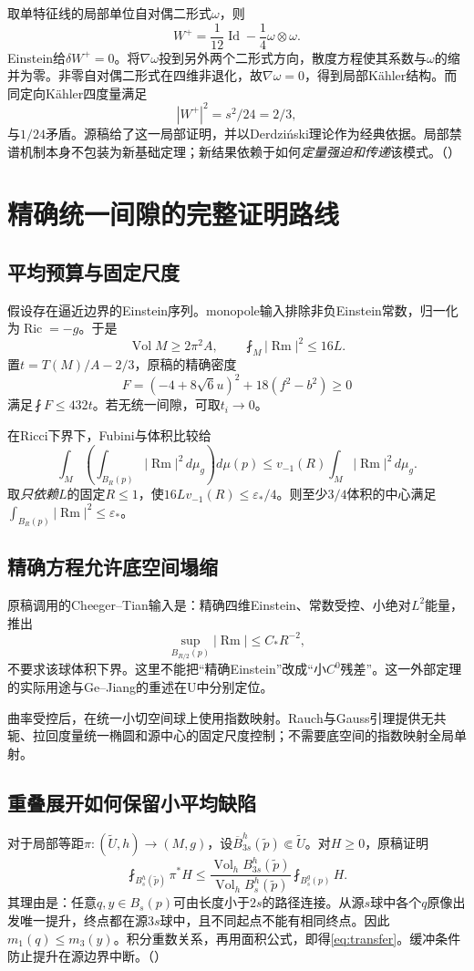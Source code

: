\documentclass[UTF8,fontset=fandol,zihao=-4]{ctexart}
\theoremstyle{research}
\DeclareMathOperator{\Ric}{Ric}
\DeclareMathOperator{\Rm}{Rm}
\DeclareMathOperator{\Vol}{Vol}
\DeclareMathOperator{\Id}{Id}
\newcommand{\dd}{\,d\mu_g}
\numberwithin{equation}{section}
\begin{document}
取单特征线的局部单位自对偶二形式$\omega$，则
\[
W^+=\frac1{12}\Id-\frac14\omega\otimes\omega.
\]
Einstein给$\delta W^+=0$。将$\nabla\omega$投到另外两个二形式方向，散度方程使其系数与$\omega$的缩并为零。非零自对偶二形式在四维非退化，故$\nabla\omega=0$，得到局部Kähler结构。而同定向Kähler四度量满足
\[
|W^+|^2=s^2/24=2/3,
\]
与$1/24$矛盾。源稿给了这一局部证明，并以Derdziński理论作为经典依据。局部禁谱机制本身不包装为新基础定理；新结果依赖于如何\emph{定量强迫和传递}该模式。\cite{U}（）\cite{Derdzinski}

\section{精确统一间隙的完整证明路线}
\subsection{平均预算与固定尺度}
假设存在逼近边界的Einstein序列。monopole输入排除非负Einstein常数，归一化为$\Ric=-g$。于是
\[
\Vol M\ge2\pi^2A,\qquad \fint_M|\Rm|^2\le16L.
\]
置$t=T(M)/A-2/3$，原稿的精确密度
\[
F=(-4+8\sqrt6u)^2+18(f^2-b^2)\ge0
\]
满足$\fint F\le432t$。若无统一间隙，可取$t_i\to0$。

在Ricci下界下，Fubini与体积比较给
\[
\int_M\left(\int_{B_R(p)}|\Rm|^2\dd\right)d\mu(p)
\le v_{-1}(R)\int_M|\Rm|^2\dd.
\]
取\emph{只依赖$L$}的固定$R\le1$，使$16L v_{-1}(R)\le\varepsilon_*/4$。则至少$3/4$体积的中心满足$\int_{B_R(p)}|\Rm|^2\le\varepsilon_*$。

\subsection{精确方程允许底空间塌缩}
原稿调用的Cheeger--Tian输入是：精确四维Einstein、常数受控、小绝对$L^2$能量，推出
\[
\sup_{B_{R/2}(p)}|\Rm|\le C_*R^{-2},
\]
不要求该球体积下界。这里不能把“精确Einstein”改成“小$C^0$残差”。这一外部定理的实际用途与Ge--Jiang的重述在U中分别定位。\cite{CT,GeJiang}

曲率受控后，在统一小切空间球上使用指数映射。Rauch与Gauss引理提供无共轭、拉回度量统一椭圆和源中心的固定尺度控制；不需要底空间的指数映射全局单射。

\subsection{重叠展开如何保留小平均缺陷}
对于局部等距$\pi:(\widetilde U,h)\to(M,g)$，设$\overline B_{3s}^h(\tilde p)\Subset\widetilde U$。对$H\ge0$，原稿证明
\begin{equation}\label{eq:transfer}
\fint_{B_s^h(\tilde p)}\pi^*H
\le\frac{\Vol_h B_{3s}^h(\tilde p)}{\Vol_h B_s^h(\tilde p)}
\fint_{B_s^g(p)}H.
\end{equation}
其理由是：任意$q,y\in B_s(p)$可由长度小于$2s$的路径连接。从源$s$球中各个$q$原像出发唯一提升，终点都在源$3s$球中，且不同起点不能有相同终点。因此$m_1(q)\le m_3(y)$。积分重数关系，再用面积公式，即得\eqref{eq:transfer}。缓冲条件防止提升在源边界中断。\cite{U}（）
\end{document}
